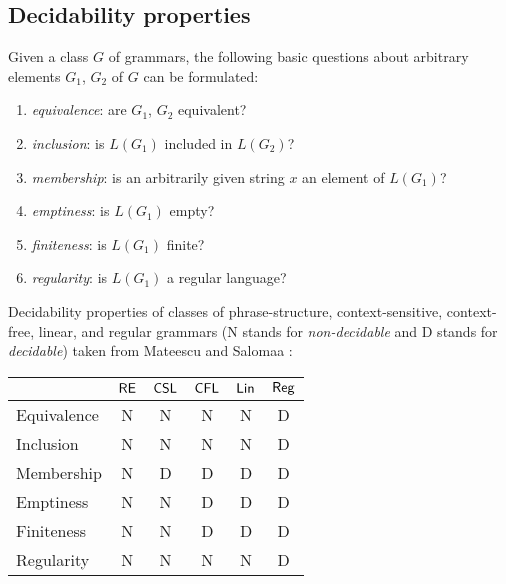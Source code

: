 \subsection{Decidability properties}
\label{subsection:decidability-properties}

Given a class $G$ of grammars, the following basic questions about arbitrary
elements $G_1$, $G_2$ of $G$ can be formulated:

\begin{enumerate}
\item {}\emph{equivalence}: are $G_1$, $G_2$ equivalent?
\item {}\emph{inclusion}: is $L(G_1)$ included in $L(G_2)$?
\item {}\emph{membership}: is an arbitrarily given string $x$ an 
element of $L(G_1)$?
\item {}\emph{emptiness}: is $L(G_1)$ empty?
\item {}\emph{finiteness}: is $L(G_1)$ finite?
\item {}\emph{regularity}: is $L(G_1)$ a regular language?
\end{enumerate}

Decidability properties of classes of phrase-structure, 
context-sensitive, context-free, linear, and regular grammars (N stands for 
\emph{non-decidable} and D stands for \emph{decidable}) taken from 
Mateescu and Salomaa \cite{MaSa1997formal}:

\begin{center}
\begin{tabular}{ | l | c | c | c | c | c | }
\hline
              & \index{$\RE$}$\RE$ 
              & \index{$\CSL$}$\CSL$ 
              & \index{$\CFL$}$\CFL$ 
              & \index{$\Lin$}$\Lin$ 
              & \index{$\Reg$}$\Reg$\\
\hline
\index{equivalence}Equivalence
              & N     & N      & N      & N      & D \\
\hline
\index{inclusion}Inclusion
              & N     & N      & N      & N      & D \\
\hline
\index{membership}Membership
              & N     & D      & D      & D      & D \\
\hline
\index{emptiness}Emptiness
              & N     & N      & D      & D      & D \\
\hline
\index{finiteness}Finiteness
              & N     & N      & D      & D      & D \\
\hline
\index{regularity}Regularity
              & N     & N      & N      & N      & D \\
\hline
\end{tabular}
\end{center}

%
